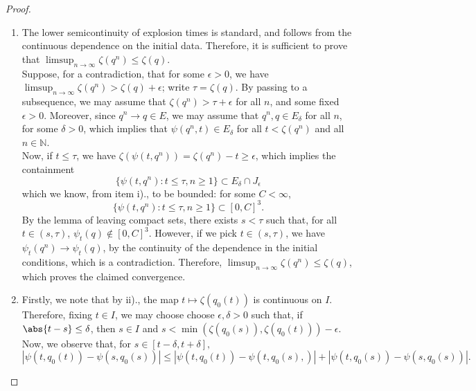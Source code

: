 \begin{proof}
\begin{enumerate}[label=\roman{*}).]
    \item The lower semicontinuity of explosion times is standard, and follows from the continuous dependence on the initial data. Therefore, it is sufficient to prove that $\limsup_{n\rightarrow \infty} \zeta(q^n)\le \zeta(q).$  \medskip \\ Suppose, for a contradiction, that for some $\epsilon>0$, we have $\limsup_{n\rightarrow \infty} \zeta(q^n)>\zeta(q)+\epsilon$; write $\tau=\zeta(q)$. By passing to a subsequence, we may assume that $\zeta(q^n)>\tau+\epsilon$ for all $n$, and some fixed $\epsilon>0$. Moreover, since $q^n\rightarrow q \in E$, we may assume that $q^n, q \in E_\delta$ for all $n$, for some $\delta>0$, which implies that $\psi(q^n,t)\in E_\delta$ for all $t<\zeta(q^n)$ and all $n\in \mathbb{N}$.\medskip\\  Now, if $t\le \tau$, we have $\zeta(\psi(t,q^n))=\zeta(q^n)-t \ge \epsilon$, which implies the containment \begin{equation} \{\psi(t,q^n): t\le \tau, n\ge 1\} \subset E_\delta\cap J_\epsilon \end{equation} which we know, from item i)., to be bounded: for some $C<\infty$, \begin{equation}
        \{\psi(t,q^n): t\le \tau, n\ge 1\} \subset [0,C]^3.
    \end{equation} By the lemma of leaving compact sets, there exists $s<\tau$ such that, for all $t\in (s,\tau)$, $\psi_t(q)\not \in [0,C]^3.$ However, if we pick $t\in (s,\tau)$, we have $\psi_t(q^n) \rightarrow \psi_t(q)$, by the continuity of the dependence in the initial conditions, which is a contradiction. Therefore, $\limsup_{n\rightarrow \infty} \zeta(q^n)\le \zeta(q)$, which proves the claimed convergence.      
    \item  Firstly, we note that by ii)., the map $t\mapsto \zeta(q_0(t))$ is continuous on $I$. Therefore, fixing $t\in I$, we may choose choose  $\epsilon, \delta > 0$ such that, if $\abs{t-s} \le \delta$, then $s\in I$ and $s < \min \left(\zeta\left(q_0(s)\right), \zeta\left(q_0(t)\right)\right)-\epsilon$. Now, we observe that, for $s\in [t-\delta, t+\delta],$\begin{equation}
    |\psi(t,q_0(t))-\psi(s,q_0(s))|\le|\psi(t,q_0(t))-\psi(t,q_0(s), )|+|\psi(t,q_0(s))-\psi(s,q_0(s))|.

\end{equation}
\end{enumerate}
\end{proof}
